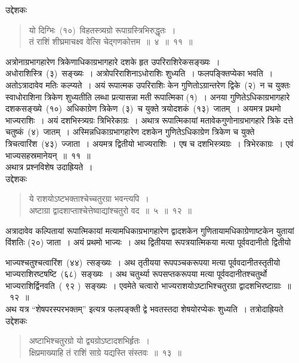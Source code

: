 \documentclass[11pt, openany]{book}
\begin{document}
\noindent उद्देशकः\textendash
\begin{quote}
{\ku
यो दिग्भिः~(१०)~विहतस्त्र्यग्रो रूपाग्रस्त्रिभिरुद्धृतः~।\\
तं राशिं शीघ्रमाचक्ष्व वेत्सि चेद्गणकोत्तम~॥~४~॥~११~॥}
\end{quote}

\indent
अत्रोनाग्रभागहारेण त्रिकेणाधिकाग्रभागहारे दशके हृत उपरिराशिरेकसङ्ख्यः~। अधोराशिस्त्रि~(३)~सङ्ख्यः~। अत्रोपरिराशिनाऽधोराशिः शुध्यति~। फलपङ्क्तिप्येका भवति~। अतोऽत्रादावेव मतिः कल्प्यते~। अयं रूपात्मक उपरिराशिः केन गुणितोऽग्रान्तरेण द्विके~(२)~न च युक्तः स्वाधोराशिना त्रिकेण शुध्यतीति लब्धा प्रत्यासन्ना मती रूपात्मिका (१)~। अनया गुणितेऽधिकाग्रभागहारे दशकसङ्ख्ये~(१०)~अधिकाग्रेण त्रिकेण~(३)~च युक्ते त्रयोदशकं~(१३)~जातम्~। अयमत्र प्रथमो भाज्यराशिः~। अयं दशभिस्त्र्यग्रः त्रिभिरेकाग्रः~। अथात्र रूपात्मिकायां मतावेकगुणोनाग्रभागहारे त्रिके दत्ते चतुष्कं~(४)~जातम्~। अस्मिन्नधिकाग्रभागहारेण दशकेन गुणितेऽधिकाग्रेण त्रिकेण च युक्ते त्रिचत्वारिंश~(४३)~ज्जाता~। अयमत्र द्वितीयो भाज्यराशिः~। एष च दशभिस्त्र्यग्रः~। त्रिभेरकाग्रः~। एवं भाज्यसहस्रमानेयन्~॥~११~॥\\

अथात्र प्रश्नविशेष उदाह्रियते~।\\

\noindent उद्देशकः\textendash
\begin{quote}
{\ku
ये राशयोऽष्टभक्ताश्चेच्चतुरग्रा भवन्त्यपि~।\\
अष्टाग्रा द्वादशाप्ताश्चेत्तेष्वाद्यांश्चतुरो वद~॥~५~॥~१२~॥}
\end{quote}

\indent
अत्रादावेव कल्पितायां रूपात्मिकायां मत्यामधिकाग्रभागहारेण द्वादशकेन गुणितायामधिकाग्रेणाष्टकेन युतायां विंशतिः (२०) जाता~। अयं प्रथमो भाज्यः~। अथ द्वितीयया रूपत्रयात्मिकया मत्या पूर्ववदानीतो द्वितीयो


\newpage
\thispagestyle{fancy}
\fancyhf{}
\noindent
भाज्यश्चतुश्चत्वारिंश~(४४)~त्सङ्ख्यः~। अथ तृतीयया रूपपञ्चकरूपया मत्या
पूर्ववदानीतस्तृतीयो भाज्यराशिरष्टषष्टि~(६८)~सङ्ख्यः~। अथ चतुर्थ्या रूपसप्तकरूपया मत्या पूर्ववदानीतश्चतुर्थो भाज्यराशिर्द्विनवति~( ९२ )~सङ्ख्यः~। एवमेते चत्वारो भाज्यराशयोऽष्टाभिश्चतुरग्रा द्वादशभिरष्टाग्राः~॥~१२~॥\\
\indent
अथ यत्र ``शेषपरस्परभक्तम्'' इत्यत्र फलपङ्क्ती द्वे भवतस्तदा शेषयोरप्येकः शुध्यति~। तत्रोदाह्रियते \textendash\\

\noindent उद्देशकः\textendash
\begin{quote}
{\ku
अष्टाभिश्चतुरग्रो यो द्व्यग्रोऽष्टादशभिर्हृतः~।\\
क्षिप्रमाख्याहि तं राशिं साग्रे यद्यस्ति संस्तवः~॥~१३~॥}
\end{quote}
\end{document}
